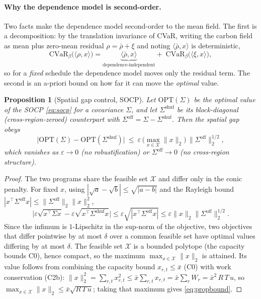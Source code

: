 \documentclass[10pt,twocolumn]{article}
\newtheorem{proposition}{Proposition}
\newcommand{\CVaR}{\mathrm{CVaR}}
\begin{document}
\paragraph{Why the dependence model is second-order.} Two facts make the
dependence model second-order to the mean field. The first is a decomposition: by
the translation invariance of CVaR, writing the carbon field as mean plus zero-mean
residual $\rho=\bar\rho+\xi$ and noting $\langle\bar\rho,x\rangle$ is deterministic,
\begin{equation}
\CVaR_\beta\!\big(\langle\rho,x\rangle\big)=
\underbrace{\langle\bar\rho,x\rangle}_{\text{dependence-independent}}+\;
\CVaR_\beta\!\big(\langle\xi,x\rangle\big),
\label{eq:meandom}
\end{equation}
so for a \emph{fixed} schedule the dependence model moves only the residual term.
The second is an a-priori bound on how far it can move the \emph{optimal} value.

\begin{proposition}[Spatial gap control, SOCP]\label{prop:meandom}
Let $\mathrm{OPT}(\Sigma)$ be the optimal value of the SOCP \eqref{eq:socp} for a
covariance $\Sigma$, and let $\Sigma^{\mathrm{shuf}}$ be its block-diagonal
(cross-region-zeroed) counterpart with $\Sigma^{\mathrm{off}}=\Sigma-
\Sigma^{\mathrm{shuf}}$. Then the spatial gap obeys
\begin{equation}
\big|\mathrm{OPT}(\Sigma)-\mathrm{OPT}(\Sigma^{\mathrm{shuf}})\big|\ \le\
\varepsilon\,\Big(\max_{x\in\mathcal X}\lVert x\rVert_2\Big)\,
\big\lVert\Sigma^{\mathrm{off}}\big\rVert_2^{1/2},
\label{eq:propbound}
\end{equation}
which vanishes as $\varepsilon\to0$ (no robustification) or
$\Sigma^{\mathrm{off}}\to0$ (no cross-region structure).
\end{proposition}

\begin{proof}
The two programs share the feasible set $\mathcal X$ and differ only in the conic
penalty. For fixed $x$, using $|\sqrt a-\sqrt b|\le\sqrt{|a-b|}$ and the Rayleigh
bound $|x^\top\Sigma^{\mathrm{off}}x|\le\lVert\Sigma^{\mathrm{off}}\rVert_2\lVert
x\rVert_2^2$,
\[
\big|\varepsilon\sqrt{x^\top\Sigma x}-\varepsilon\sqrt{x^\top\Sigma^{\mathrm{shuf}}x}\big|
\le\varepsilon\sqrt{|x^\top\Sigma^{\mathrm{off}}x|}
\le\varepsilon\lVert x\rVert_2\lVert\Sigma^{\mathrm{off}}\rVert_2^{1/2}.
\]
Since the infimum is $1$-Lipschitz in the sup-norm of the objective, two objectives
that differ pointwise by at most $\delta$ over a common feasible set have optimal
values differing by at most $\delta$. The feasible set $\mathcal X$ is a bounded
polytope (the capacity bounds C0), hence compact, so the maximum
$\max_{x\in\mathcal X}\lVert x\rVert_2$ is attained. Its value follows from combining
the capacity bound $x_{r,t}\le\bar x$ (C0) with work conservation (C2b):
$\lVert x\rVert_2^2=\sum_{r,t}x_{r,t}^2\le\bar x\sum_{r,t}x_{r,t}=\bar x\sum_r W_r
=\bar x^2\,R\,T\,u$, so $\max_{x\in\mathcal X}\lVert x\rVert_2\le\bar x\sqrt{R\,T\,u}$;
taking that maximum gives \eqref{eq:propbound}.
\end{proof}
\end{document}
